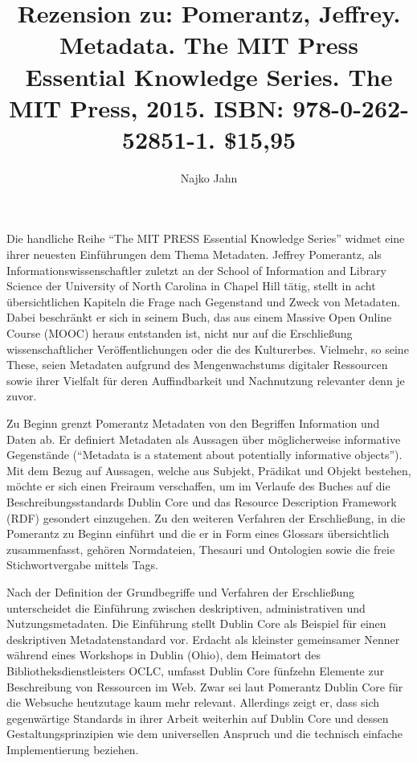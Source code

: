 \documentclass[a4paper,
fontsize=11pt,
oneside,
numbers=noperiodatend,
parskip=half-,
bibliography=totoc,
final
]{scrartcl}
\title{\LARGE{Rezension zu: Pomerantz, Jeffrey. Metadata. The MIT Press Essential Knowledge Series. The MIT Press, 2015. ISBN: 978-0-262-52851-1. \$15,95}} %
\author{Najko Jahn} %
\date{}
\begin{document}
\maketitle
\thispagestyle{fancyplain} 


Die handliche Reihe \enquote{The MIT PRESS Essential Knowledge Series}
widmet eine ihrer neuesten Einführungen dem Thema Metadaten. Jeffrey
Pomerantz, als Informationswissenschaftler zuletzt an der School of
Information and Library Science der University of North Carolina in
Chapel Hill tätig, stellt in acht übersichtlichen Kapiteln die Frage
nach Gegenstand und Zweck von Metadaten. Dabei beschränkt er sich in
seinem Buch, das aus einem Massive Open Online Course (MOOC) heraus
entstanden ist, nicht nur auf die Erschließung wissenschaftlicher
Veröffentlichungen oder die des Kulturerbes. Vielmehr, so seine These,
seien Metadaten aufgrund des Mengenwachstums digitaler Ressourcen sowie
ihrer Vielfalt für deren Auffindbarkeit und Nachnutzung relevanter denn
je zuvor.

Zu Beginn grenzt Pomerantz Metadaten von den Begriffen Information und
Daten ab. Er definiert Metadaten als Aussagen über möglicherweise
informative Gegenstände (\enquote{Metadata is a statement about
potentially informative objects}). Mit dem Bezug auf Aussagen, welche
aus Subjekt, Prädikat und Objekt bestehen, möchte er sich einen Freiraum
verschaffen, um im Verlaufe des Buches auf die Beschreibungsstandards
Dublin Core und das Resource Description Framework (RDF) gesondert
einzugehen. Zu den weiteren Verfahren der Erschließung, in die Pomerantz
zu Beginn einführt und die er in Form eines Glossars übersichtlich
zusammenfasst, gehören Normdateien, Thesauri und Ontologien sowie die
freie Stichwortvergabe mittels Tags.

Nach der Definition der Grundbegriffe und Verfahren der Erschließung
unterscheidet die Einführung zwischen deskriptiven, administrativen und
Nutzungsmetadaten. Die Einführung stellt Dublin Core als Beispiel für
einen deskriptiven Metadatenstandard vor. Erdacht als kleinster
gemeinsamer Nenner während eines Workshops in Dublin (Ohio), dem
Heimatort des Bibliotheksdienstleisters OCLC, umfasst Dublin Core
fünfzehn Elemente zur Beschreibung von Ressourcen im Web. Zwar sei laut
Pomerantz Dublin Core für die Websuche heutzutage kaum mehr relevant.
Allerdings zeigt er, dass sich gegenwärtige Standards in ihrer Arbeit
weiterhin auf Dublin Core und dessen Gestaltungsprinzipien wie dem
universellen Anspruch und die technisch einfache Implementierung
beziehen.
\end{document}
